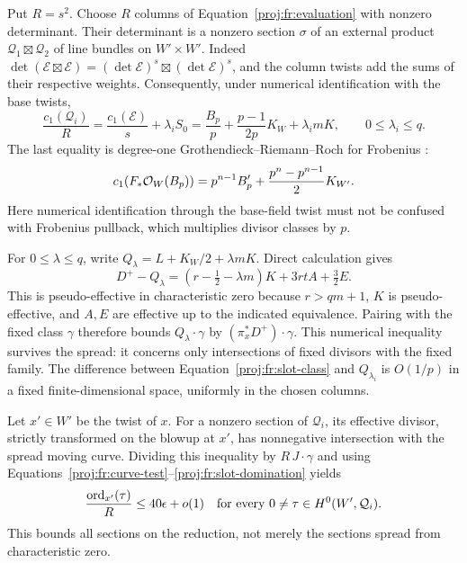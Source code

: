 Put \(R=s^2\). Choose \(R\) columns of
Equation~\eqref{proj:fr:evaluation} with nonzero determinant. Their
determinant is a nonzero section \(\sigma\) of an external product
\(\mathcal Q_1\boxtimes\mathcal Q_2\) of line bundles on \(W'\times W'\).
Indeed
\(\det(\mathcal E\boxtimes\mathcal E)
 =(\det\mathcal E)^s\boxtimes(\det\mathcal E)^s\),
and the column twists add the sums of their respective weights.
Consequently, under numerical identification with the base twists,
\begin{equation}
\label{proj:fr:slot-class}
 \frac{c_1(\mathcal Q_i)}{R}
   =\frac{c_1(\mathcal E)}s+\lambda_iS_0
   =\frac{B_p}{p}+\frac{p-1}{2p}K_W+\lambda_i mK,
 \qquad 0\leq\lambda_i\leq q.
\end{equation}
The last equality is degree-one Grothendieck--Riemann--Roch for
Frobenius \cite[Lemma~4.2]{Proj-Sun2008}:
\[
 c_1(F_*\mathcal{O}_W(B_p))
   =p^{n-1}B'_p+\frac{p^n-p^{n-1}}2K_{W'}.
\]
Here numerical identification through the base-field twist must not
be confused with Frobenius pullback, which multiplies divisor classes
by \(p\).

For \(0\leq\lambda\leq q\), write
\(Q_\lambda=L+K_W/2+\lambda mK\). Direct calculation gives
\begin{equation}
\label{proj:fr:slot-domination}
 D^+-Q_\lambda
   =(r-\tfrac12-\lambda m)K+3rtA+\tfrac32E.
\end{equation}
This is pseudo-effective in characteristic zero because
\(r>qm+1\), \(K\) is pseudo-effective, and \(A,E\) are effective up
to the indicated equivalence. Pairing with the fixed class \(\gamma\)
therefore bounds \(Q_\lambda\cdot\gamma\) by
\((\pi_x^*D^+)\cdot\gamma\). This numerical inequality survives the
spread: it concerns only intersections of fixed divisors with the
fixed family. The difference between
Equation~\eqref{proj:fr:slot-class} and \(Q_{\lambda_i}\) is \(O(1/p)\)
in a fixed finite-dimensional space, uniformly in the chosen columns.

Let \(x'\in W'\) be the twist of \(x\). For a nonzero section of
\(\mathcal Q_i\), its effective divisor, strictly transformed on the
blowup at \(x'\), has nonnegative intersection with the spread moving
curve. Dividing this inequality by \(R\,J\cdot\gamma\) and using
Equations~\eqref{proj:fr:curve-test}--\eqref{proj:fr:slot-domination} yields
\begin{equation}
\label{proj:fr:slot-order}
 \frac{\operatorname{ord}_{x'}(\tau)}R\leq40\epsilon+o(1)
 \quad\text{for every }0\ne\tau\in H^0(W',\mathcal Q_i).
\end{equation}
This bounds all sections on the reduction, not merely the sections
spread from characteristic zero.

